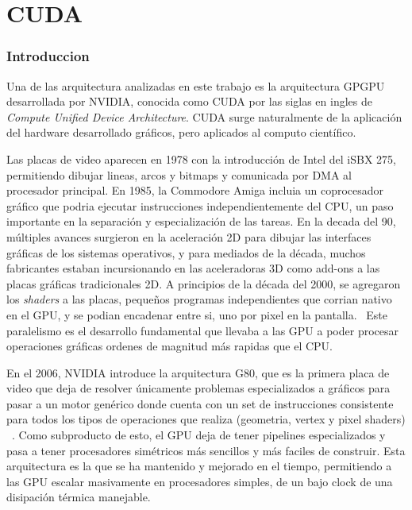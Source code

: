 \section{CUDA}

\subsubsection{Introduccion}

Una de las arquitectura analizadas en este trabajo es la arquitectura GPGPU desarrollada por NVIDIA, conocida
como CUDA por las siglas en ingles de \textit{Compute Unified Device Architecture}.
CUDA surge naturalmente de la aplicaci\'on del hardware desarrollado gr\'aficos, pero aplicados al computo cient\'ifico.

Las placas de video aparecen en 1978 con la introducci\'on de Intel del iSBX 275, permitiendo dibujar lineas,
arcos y bitmaps y comunicada por DMA al procesador principal. En 1985, la Commodore Amiga incluia un coprocesador
gr\'afico que podria ejecutar instrucciones independientemente del CPU, un paso importante en la separaci\'on
y especializaci\'on de las tareas. En la decada del 90, m\'ultiples
avances surgieron en la aceleraci\'on 2D para dibujar las interfaces gr\'aficas de los sistemas operativos,
y para mediados de la d\'ecada, muchos fabricantes estaban incursionando en las aceleradoras 3D como
add-ons a las placas gr\'aficas tradicionales 2D. A principios de la d\'ecada del 2000, se agregaron los
\textit{shaders} a las placas, peque\~nos programas independientes que corrian nativo en el GPU,
y se podian encadenar entre si, uno por pixel en la pantalla.~\cite{CG} Este paralelismo es el desarrollo fundamental
que llevaba a las GPU a poder procesar operaciones gr\'aficas ordenes de magnitud m\'as rapidas que el CPU.

En el 2006, NVIDIA introduce la arquitectura G80,
que es la primera placa de video que deja de resolver \'unicamente problemas especializados a gr\'aficos
para pasar a un motor gen\'erico donde cuenta con un set de instrucciones consistente para todos los
tipos de operaciones que realiza (geometria, vertex y pixel shaders) ~\cite{cudaHandbook}. Como subproducto de esto,
el GPU deja de tener pipelines especializados y pasa a tener procesadores sim\'etricos m\'as sencillos y m\'as
faciles de construir. Esta arquitectura es la que se ha mantenido y mejorado en el tiempo, permitiendo
a las GPU escalar masivamente en procesadores simples, de un bajo clock de una disipaci\'on t\'ermica
manejable.

